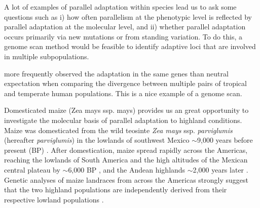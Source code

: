 %
%
A lot of examples of parallel adaptation within species lead us to ask some questions such as 
i) how often parallelism at the phenotypic level is reflected by parallel adaptation at the molecular level, and 
ii) whether parallel adaptation occurs primarily via new mutations or from standing variation.
To do this, a genome scan method would be feasible to identify adaptive loci that are involved in multiple subpopulations.

\cite{Tennessen_2011_21698142} more frequently observed the adaptation in the same genes than neutral expectation when comparing the divergence between multiple pairs of tropical and temperate human populations.  This is a nice example of a genome scan. 

Domesticated maize (Zea mays ssp. mays) provides us an great opportunity to investigate the molecular basis of parallel adaptation to highland conditions.  Maize was domesticated from the wild teosinte \emph{Zea mays} ssp. \emph{parviglumis} (hereafter \emph{parviglumis}) in the lowlands of southwest Mexico $\sim$9,000 years before present (BP) \cite[]{Matsuoka_2002_11983901,Piperno_2009_19307570,vanHeerwaarden_2011_21189301}. After domestication, maize spread rapidly across the Americas, reaching the lowlands of South America and the high altitudes of the Mexican central plateau by $\sim$6,000 BP \cite[]{Piperno_2006_69}, and the Andean highlands $\sim$2,000 years later \cite[]{Perry_2006_16511492,Grobman_2012_22307642}. Genetic analyses of maize landraces from across the Americas strongly suggest that the two highland populations are independently derived from their respective lowland populations \cite[]{Vigouroux_2008_21632329, vanHeerwaarden_2011_21189301}. 

